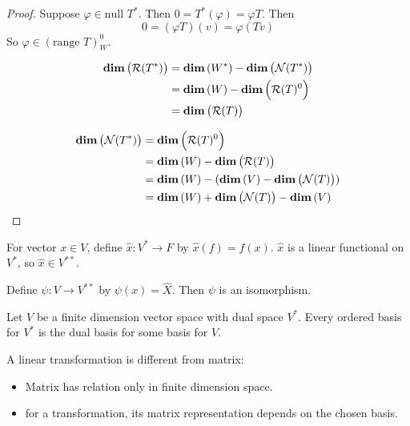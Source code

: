 \begin{proof}
    Suppose $\varphi \in \text{null } T^*$. Then $ 0 = T^*(\varphi) = \varphi T$. Then
    \begin{equation*}
        0 = (\varphi T)(v) = \varphi (Tv) 
    \end{equation*}
    So $\varphi \in (\text{range } T)^0_W$.
    
    \begin{equation*}
        \begin{aligned}
            \displaystyle \mathbf{dim}\left( \mathcal{R}(T^*) \right) &= \displaystyle \mathbf{dim}\left( W^* \right) - \displaystyle \mathbf{dim}\left( \mathcal{N}(T^*) \right) \\
            &= \displaystyle \mathbf{dim}\left( W \right) - \displaystyle \mathbf{dim}\left( \mathcal{R}(T)^0 \right) \\
            &= \displaystyle \mathbf{dim}\left( \mathcal{R}(T) \right)
        \end{aligned}
    \end{equation*}
    
    \begin{equation*}
        \begin{aligned}
            \displaystyle \mathbf{dim}\left( \mathcal{N}(T^*) \right) &= \displaystyle \mathbf{dim}\left( \mathcal{R}(T)^0 \right)\\
            &= \displaystyle \mathbf{dim}\left( W \right) - \displaystyle \mathbf{dim}\left( \mathcal{R}(T) \right) \\
            &= \displaystyle \mathbf{dim}\left( W \right) - (\displaystyle \mathbf{dim}\left( V \right) - \displaystyle \mathbf{dim}\left( \mathcal{N}(T) \right) ) \\
            &= \displaystyle \mathbf{dim}\left( W \right) + \displaystyle \mathbf{dim}\left( \mathcal{N}(T) \right) - \displaystyle \mathbf{dim}\left( V \right)
        \end{aligned}
    \end{equation*}
\end{proof}


\begin{definition}
    For vector $x \in V$, define $\hat{x}: V^* \rightarrow F $ by $\hat{x}(f) = f(x)$. $\hat{x}$ is a linear functional on $V^*$, so $\hat{x} \in V^{**}$.
\end{definition}


\begin{theorem}
    Define $\psi : V \rightarrow V^{**}$ by $\psi (x) = \hat{X}$.  Then $\psi$ is an isomorphism.
\end{theorem}

\begin{theorem}
    Let $V$ be a finite dimension vector space with dual space $V^*$. Every ordered basis for $V^*$ is the dual basis for some basis for $V$.
\end{theorem}

\begin{center}
\end{center}



A linear transformation is different from matrix:
\begin{itemize}
    \item Matrix has relation only in finite dimension space.
    \item for a transformation, its matrix representation depends on the chosen basis.
\end{itemize}


